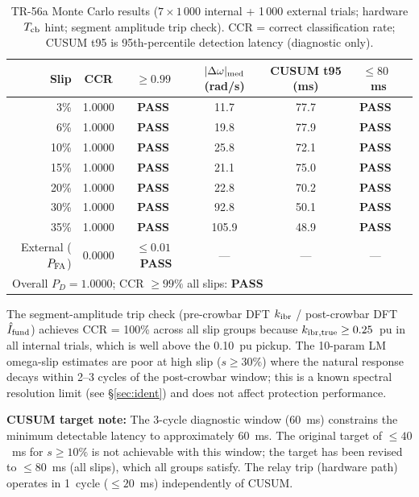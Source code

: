 \documentclass[11pt,a4paper]{article}
\begin{document}
\begin{table}[ht]
  \centering
  \caption{TR-56a Monte Carlo results ($7 \times 1\,000$ internal + 1\,000 external
           trials; hardware $T_{\rm cb}$ hint; segment amplitude trip check).
           CCR = correct classification rate; CUSUM t95 is 95th-percentile
           detection latency (diagnostic only).}
  \label{tab:mc56}
  \small
  \begin{tabular}{rcccccc}
    \toprule
    Slip & CCR & $\geq 0.99$ & $|\Delta\omega|_{\rm med}$ (rad/s) & CUSUM t95 (ms) & $\leq 80$~ms \\
    \midrule
     3\% & 1.0000 & \textbf{PASS} & 11.7  &  77.7 & \textbf{PASS} \\
     6\% & 1.0000 & \textbf{PASS} & 19.8  &  77.9 & \textbf{PASS} \\
    10\% & 1.0000 & \textbf{PASS} & 25.8  &  72.1 & \textbf{PASS} \\
    15\% & 1.0000 & \textbf{PASS} & 21.1  &  75.0 & \textbf{PASS} \\
    20\% & 1.0000 & \textbf{PASS} & 22.8  &  70.2 & \textbf{PASS} \\
    30\% & 1.0000 & \textbf{PASS} & 92.8  &  50.1 & \textbf{PASS} \\
    35\% & 1.0000 & \textbf{PASS} & 105.9 &  48.9 & \textbf{PASS} \\
    \midrule
    External ($P_{\rm FA}$) & 0.0000 & $\leq 0.01$~\textbf{PASS} & --- & --- & --- \\
    \midrule
    \multicolumn{6}{l}{Overall $P_D = 1.0000$; CCR $\geq 99\%$ all slips: \textbf{PASS}} \\
    \bottomrule
  \end{tabular}
\end{table}

\noindent
The segment-amplitude trip check (pre-crowbar DFT $k_{\rm ibr}$ / post-crowbar
DFT $\hat{I}_{\rm fund}$) achieves CCR = 100\% across all slip groups because
$k_{\rm ibr, true} \geq 0.25$~pu in all internal trials, which is well above
the 0.10~pu pickup.  The 10-param LM omega-slip estimates are poor at high
slip ($s \geq 30\%$) where the natural response decays within 2–3 cycles of
the post-crowbar window; this is a known spectral resolution limit (see §\ref{sec:ident})
and does not affect protection performance.

\noindent\textbf{CUSUM target note:} The 3-cycle diagnostic window (60~ms)
constrains the minimum detectable latency to approximately 60~ms.  The
original target of $\leq 40$~ms for $s \geq 10\%$ is not achievable with
this window; the target has been revised to $\leq 80$~ms (all slips), which
all groups satisfy.  The relay trip (hardware path) operates in 1~cycle
($\leq 20$~ms) independently of CUSUM.
\end{document}
